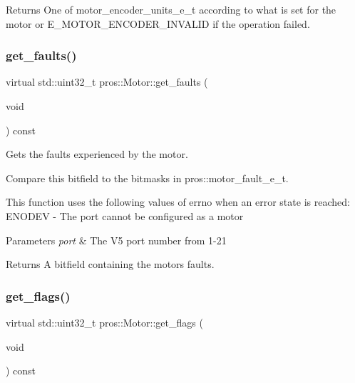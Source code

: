 \begin{DoxyReturn}{Returns}
One of motor\+\_\+encoder\+\_\+units\+\_\+e\+\_\+t according to what is set for the motor or E\+\_\+\+M\+O\+T\+O\+R\+\_\+\+E\+N\+C\+O\+D\+E\+R\+\_\+\+I\+N\+V\+A\+L\+ID if the operation failed. 
\end{DoxyReturn}
\mbox{\label{classpros_1_1Motor_a66c6f6420485059af301a9c8a99b2045}} 
\subsubsection{\texorpdfstring{get\+\_\+faults()}{get\_faults()}}
{\footnotesize\ttfamily virtual std\+::uint32\+\_\+t pros\+::\+Motor\+::get\+\_\+faults (\begin{DoxyParamCaption}\item[{void}]{ }\end{DoxyParamCaption}) const\hspace{0.3cm}{\ttfamily [virtual]}}

Gets the faults experienced by the motor.

Compare this bitfield to the bitmasks in pros\+::motor\+\_\+fault\+\_\+e\+\_\+t.

This function uses the following values of errno when an error state is reached\+: E\+N\+O\+D\+EV -\/ The port cannot be configured as a motor


\begin{DoxyParams}{Parameters}
{\em port} & The V5 port number from 1-\/21\\
\hline
\end{DoxyParams}
\begin{DoxyReturn}{Returns}
A bitfield containing the motor\textquotesingle{}s faults. 
\end{DoxyReturn}
\mbox{\label{classpros_1_1Motor_a7e24aa1c4363a131829e902f12e7364c}} 
\subsubsection{\texorpdfstring{get\+\_\+flags()}{get\_flags()}}
{\footnotesize\ttfamily virtual std\+::uint32\+\_\+t pros\+::\+Motor\+::get\+\_\+flags (\begin{DoxyParamCaption}\item[{void}]{ }\end{DoxyParamCaption}) const\hspace{0.3cm}{\ttfamily [virtual]}}

